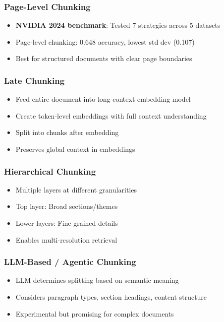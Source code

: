 \documentclass[11pt,letterpaper]{article}
\begin{document}
\subsubsection{Page-Level Chunking}
\begin{itemize}[leftmargin=*]
    \item \textbf{NVIDIA 2024 benchmark}: Tested 7 strategies across 5 datasets
    \item Page-level chunking: 0.648 accuracy, lowest std dev (0.107)
    \item Best for structured documents with clear page boundaries
\end{itemize}

\subsubsection{Late Chunking}
\begin{itemize}[leftmargin=*]
    \item Feed entire document into long-context embedding model
    \item Create token-level embeddings with full context understanding
    \item Split into chunks after embedding
    \item Preserves global context in embeddings
\end{itemize}

\subsubsection{Hierarchical Chunking}
\begin{itemize}[leftmargin=*]
    \item Multiple layers at different granularities
    \item Top layer: Broad sections/themes
    \item Lower layers: Fine-grained details
    \item Enables multi-resolution retrieval
\end{itemize}

\subsubsection{LLM-Based / Agentic Chunking}
\begin{itemize}[leftmargin=*]
    \item LLM determines splitting based on semantic meaning
    \item Considers paragraph types, section headings, content structure
    \item Experimental but promising for complex documents
\end{itemize}
\end{document}
